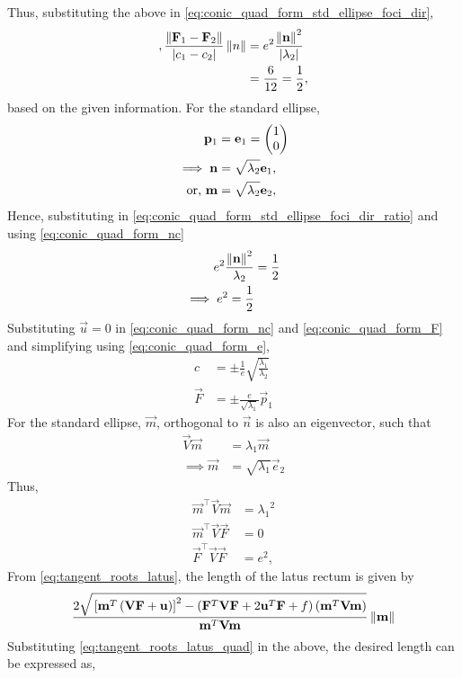 \documentclass[journal,12pt,twocolumn]{IEEEtran}
\renewcommand\thesection{\arabic{section}}
\renewcommand\thesubsection{\thesection.\arabic{subsection}}
\begin{document}
\begin{enumerate}[label=\thesubsection.\arabic*.,ref=\thesubsection.\theenumi]
Thus, substituting the above in 
  \eqref{eq:conic_quad_form_std_ellipse_foci_dir}, 
\begin{align}
  \label{eq:conic_quad_form_std_ellipse_foci_dir_ratio}, 
	\frac{\left\lVert\mathbf{F}_1 - \mathbf{F}_2\right\rVert}{\left\vert c_1-c_2\right\vert} \left\lVert n\right\rVert &= e^2\frac{\left\lVert\mathbf{n}\right\rVert^2}{\left\vert\lambda_2\right\vert}
	\\
	&=\frac{6}{12} = \frac{1}{2},
\end{align}
based on the given information.  For the standard ellipse, 
\begin{align}
	\mathbf{p}_1 &= \mathbf{e}_1 = \begin{pmatrix}1 \\ 0\end{pmatrix}
	\\
	\implies \mathbf{n} &= \sqrt{\lambda_2}\mathbf{e}_1,  
	\\
	\text{or, }\mathbf{m} &=\sqrt{\lambda_2}\mathbf{e}_2,   
\end{align}
Hence, substituting in 
  \eqref{eq:conic_quad_form_std_ellipse_foci_dir_ratio} and using  
\eqref{eq:conic_quad_form_nc} 
\begin{align}
	e^2\frac{\left\lVert\mathbf{n}\right\rVert^2}{\lambda_2} &= \frac{1}{2}
	\\
	\implies e^2 = \frac{1}{2}
\end{align}
Substituting $\vec{u} = 0$ in 
\eqref{eq:conic_quad_form_nc} and 
  \eqref{eq:conic_quad_form_F} 
  and simplifying using
  \eqref{eq:conic_quad_form_e},
\begin{align}
	c &= \pm \frac{1}{e}\sqrt{\frac{\lambda_1}{\lambda_2}}
	\\
	\vec{F} &= \pm \frac{e}{\sqrt{\lambda_1}}\vec{p}_1
\end{align}
For the standard ellipse, $\vec{m}$, orthogonal to $\vec{n}$ is also an eigenvector, such that 
\begin{align}
	\vec{V}\vec{m} &= {\lambda_1}\vec{m}  
	\\
	\implies\vec{m} &=  \sqrt{\lambda_1}\vec{e}_2
\end{align}
Thus, 
\begin{align}
	\vec{m}^{\top}\vec{V}\vec{m} &= {\lambda_1}^2
	\\
	\vec{m}^{\top}\vec{V}\vec{F} &= 0
	\\
	\vec{F}^{\top}\vec{V}\vec{F} &=e^2 
\label{eq:tangent_roots_latus_quad},
\end{align}
From 
\eqref{eq:tangent_roots_latus},
the length of the latus rectum is given by 
{\tiny
\begin{multline}
 \frac{2\sqrt{
{}\left[
\mathbf{m}^T\left(\mathbf{V}\mathbf{F}+\mathbf{u}\right)
\right]^2
-
\left(
\mathbf{F}^T\mathbf{V}\mathbf{F} + 2\mathbf{u}^T\mathbf{F} +f
\right)
\left(\mathbf{m}^T\mathbf{V}\mathbf{m}\right)
}
}
{
\mathbf{m}^T\mathbf{V}\mathbf{m}
}\left\lVert\mathbf{m}\right\rVert
\end{multline}
}
Substituting \eqref{eq:tangent_roots_latus_quad} in the above, the desired length can be expressed as,



\end{enumerate}
\end{document}
